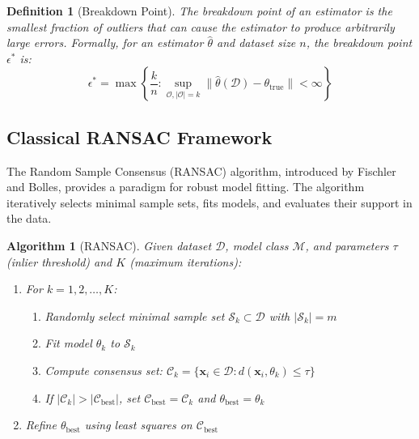 \documentclass[12pt]{article}
\renewcommand{\vec}[1]{\mathbf{#1}}
\newtheorem{definition}[theorem]{Definition}
\newtheorem{algorithm}[theorem]{Algorithm}
\begin{document}
\begin{definition}[Breakdown Point]
    \label{def:breakdown_point}
    The breakdown point of an estimator is the smallest fraction of outliers that can cause the estimator to produce arbitrarily large errors. Formally, for an estimator $\hat{\theta}$ and dataset size $n$, the breakdown point $\epsilon^*$ is:
    \begin{equation}
        \epsilon^* = \max\left\{\frac{k}{n} : \sup_{\mathcal{O}, |\mathcal{O}|=k} \|\hat{\theta}(\mathcal{D}) - \theta_{\text{true}}\| < \infty\right\}
    \end{equation}
\end{definition}


\subsection{Classical RANSAC Framework}
\label{subsec:classical_ransac}

The Random Sample Consensus (RANSAC) algorithm, introduced by Fischler and Bolles, provides a paradigm for robust model fitting. The algorithm iteratively selects minimal sample sets, fits models, and evaluates their support in the data.

\begin{algorithm}[RANSAC]
    \label{alg:ransac}
    Given dataset $\mathcal{D}$, model class $\mathcal{M}$, and parameters $\tau$ (inlier threshold) and $K$ (maximum iterations):
    \begin{enumerate}
        \item For $k = 1, 2, \ldots, K$:
              \begin{enumerate}
                  \item Randomly select minimal sample set $\mathcal{S}_k \subset \mathcal{D}$ with $|\mathcal{S}_k| = m$
                  \item Fit model $\theta_k$ to $\mathcal{S}_k$
                  \item Compute consensus set: $\mathcal{C}_k = \{\vec{x}_i \in \mathcal{D} : d(\vec{x}_i, \theta_k) \leq \tau\}$
                  \item If $|\mathcal{C}_k| > |\mathcal{C}_{\text{best}}|$, set $\mathcal{C}_{\text{best}} = \mathcal{C}_k$ and $\theta_{\text{best}} = \theta_k$
              \end{enumerate}
        \item Refine $\theta_{\text{best}}$ using least squares on $\mathcal{C}_{\text{best}}$
    \end{enumerate}
\end{algorithm}
\end{document}
